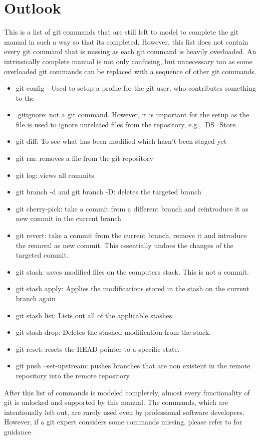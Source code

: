\section{Outlook}
This is a list of git commands that are still left to model to complete the git manual in such a way so that its completed. However, this list does not contain every git command that is missing as each git command is heavily overloaded. An intrinsically complete manual is not only confusing, but unnecessary too as some overloaded git commands can be replaced with a sequence of other git commands.
\begin{itemize} [nosep]
    \item git config - Used to setup a profile for the git user, who contributes something to the 
    \item .gitignore: not a git command. However, it is important for the setup as the file is used to ignore unrelated files from the repository, e.g., .DS\_Store
    \item git diff: To see what has been modified which hasn't been staged yet
    \item git rm: removes a file from the git repository
    \item git log: views all commits
    \item git branch -d and git branch -D: deletes the targeted branch
    \item git cherry-pick: take a commit from a different branch and reintroduce it as new commit in the current branch
    \item git revert: take a commit from the current branch, remove it and introduce the removal as new commit. This essentially undoes the changes of the targeted commit.
    \item git stash: saves modified files on the computers stack. This is not a commit.
    \item git stash apply: Applies the modifications stored in the stash on the current branch again
    \item git stash list: Lists out all of the applicable stashes.
    \item git stash drop: Deletes the stashed modification from the stack.
    \item git reset: resets the HEAD pointer to a specific state.
    \item git push --set-upstream: pushes branches that are non existent in the remote repository into the remote repository.
\end{itemize}
After this list of commands is modeled completely, almost every functionality of git is unlocked and supported by this manual. The commands, which are intentionally left out, are rarely used even by professional software developers. However, if a git expert considers some commands missing, please refer to \cite{CS20} for guidance.